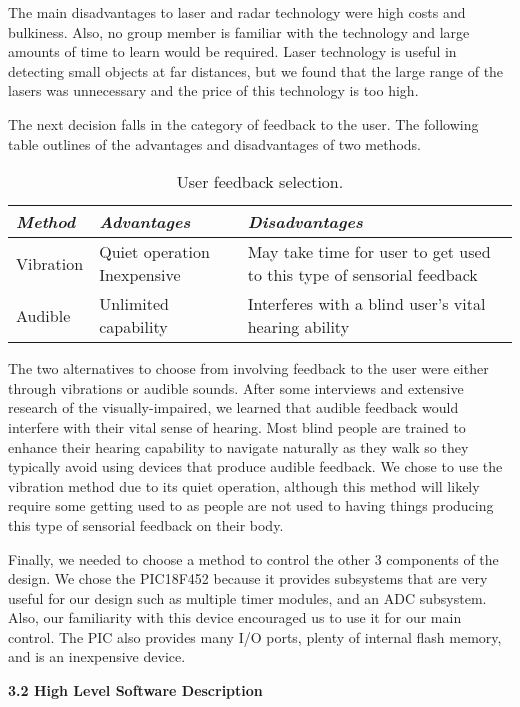 The main disadvantages to laser and radar technology were high costs and
bulkiness. Also, no group member is familiar with the technology and
large amounts of time to learn would be required. Laser technology is
useful in detecting small objects at far distances, but we found that
the large range of the lasers was unnecessary and the price of this
technology is too high.

The next decision falls in the category of feedback to the user. The
following table outlines of the advantages and disadvantages of two
methods.

\begin{table}[h]
\caption{User feedback selection.}
\label{table:appendixEuserFeedback}
\begin{tabular}{|m{3cm}|m{4cm}|m{5cm}|} \hline
\emph{\textbf{Method}} & \emph{\textbf{Advantages}} & \emph{\textbf{Disadvantages}} \\ \hline
Vibration & Quiet operation Inexpensive & May take time for user to get used to this type of
sensorial feedback \\ \hline
Audible & Unlimited capability & Interferes with a blind user's vital
hearing ability \\ \hline
\end{tabular}
\end{table}

The two alternatives to choose from involving feedback to the user were
either through vibrations or audible sounds. After some interviews and
extensive research of the visually-impaired, we learned that audible
feedback would interfere with their vital sense of hearing. Most blind
people are trained to enhance their hearing capability to navigate
naturally as they walk so they typically avoid using devices that
produce audible feedback. We chose to use the vibration method due to
its quiet operation, although this method will likely require some
getting used to as people are not used to having things producing this
type of sensorial feedback on their body.

Finally, we needed to choose a method to control the other 3 components
of the design. We chose the PIC18F452 because it provides subsystems
that are very useful for our design such as multiple timer modules, and
an ADC subsystem. Also, our familiarity with this device encouraged us
to use it for our main control. The PIC also provides many I/O ports,
plenty of internal flash memory, and is an inexpensive device.


 \textbf{3.2 High Level Software Description}

